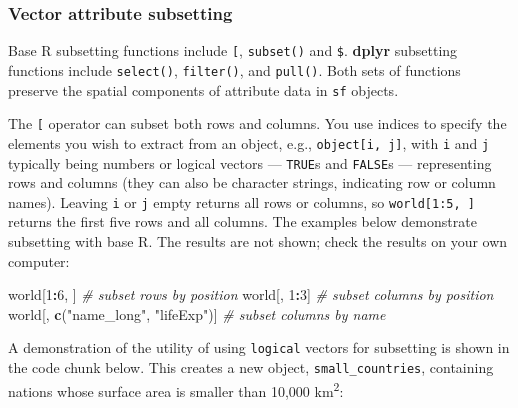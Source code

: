 \documentclass[]{krantz}
\newenvironment{Shaded}{\begin{snugshade}}{\end{snugshade}}
\newcommand{\CommentTok}[1]{\textcolor[rgb]{0.37,0.37,0.37}{\textit{#1}}}
\newcommand{\DecValTok}[1]{\textcolor[rgb]{0.06,0.06,0.06}{#1}}
\newcommand{\KeywordTok}[1]{\textcolor[rgb]{0.27,0.27,0.27}{\textbf{#1}}}
\newcommand{\NormalTok}[1]{#1}
\newcommand{\OperatorTok}[1]{\textcolor[rgb]{0.43,0.43,0.43}{\textbf{#1}}}
\newcommand{\StringTok}[1]{\textcolor[rgb]{0.5,0.5,0.5}{#1}}
\begin{document}
\hypertarget{vector-attribute-subsetting}{%
\subsubsection{Vector attribute subsetting}\label{vector-attribute-subsetting}}

Base R subsetting functions include \texttt{{[}}, \texttt{subset()} and \texttt{\$}.
\textbf{dplyr} subsetting functions include \texttt{select()}, \texttt{filter()}, and \texttt{pull()}.
Both sets of functions preserve the spatial components of attribute data in \texttt{sf} objects.

The \texttt{{[}} operator can subset both rows and columns.
You use indices to specify the elements you wish to extract from an object, e.g., \texttt{object{[}i,\ j{]}}, with \texttt{i} and \texttt{j} typically being numbers or logical vectors --- \texttt{TRUE}s and \texttt{FALSE}s --- representing rows and columns (they can also be character strings, indicating row or column names).
Leaving \texttt{i} or \texttt{j} empty returns all rows or columns, so \texttt{world{[}1:5,\ {]}} returns the first five rows and all columns.
The examples below demonstrate subsetting with base R.
The results are not shown; check the results on your own computer:

\begin{Shaded}
\begin{Highlighting}[]
\NormalTok{world[}\DecValTok{1}\OperatorTok{:}\DecValTok{6}\NormalTok{, ] }\CommentTok{# subset rows by position}
\NormalTok{world[, }\DecValTok{1}\OperatorTok{:}\DecValTok{3}\NormalTok{] }\CommentTok{# subset columns by position}
\NormalTok{world[, }\KeywordTok{c}\NormalTok{(}\StringTok{"name_long"}\NormalTok{, }\StringTok{"lifeExp"}\NormalTok{)] }\CommentTok{# subset columns by name}
\end{Highlighting}
\end{Shaded}

A demonstration of the utility of using \texttt{logical} vectors for subsetting is shown in the code chunk below.
This creates a new object, \texttt{small\_countries}, containing nations whose surface area is smaller than 10,000 km\textsuperscript{2}:

\begin{Shaded}
\end{Shaded}
\end{document}
